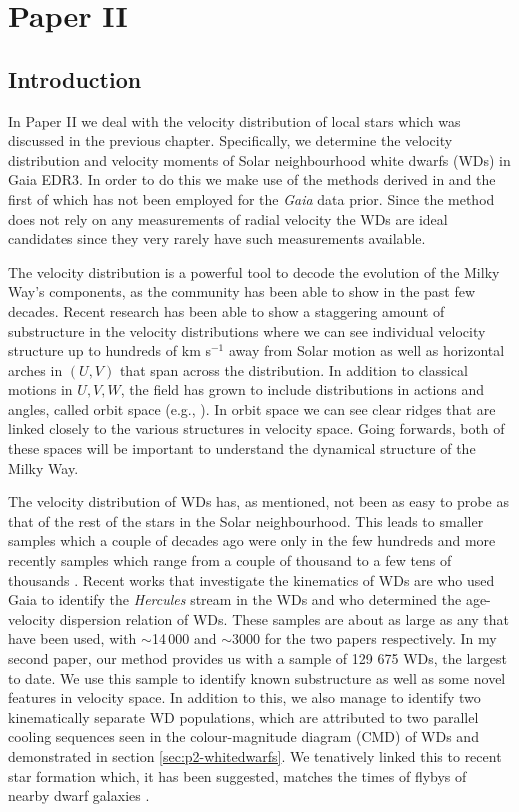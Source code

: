 \chapter{Paper II}\label{chap:paper2}
\section{Introduction}\label{sec:p2-intro}
In Paper II we deal with the velocity distribution of local stars which was discussed in the previous chapter. Specifically, we determine the velocity distribution and velocity moments of Solar neighbourhood white dwarfs (WDs) in Gaia EDR3. In order to do this we make use of the methods derived in \cite{dehnen:98a} and \cite{dehnen:98b} the first of which has not been employed for the \textit{Gaia} data prior. Since the method does not rely on any measurements of radial velocity the WDs are ideal candidates since they very rarely have such measurements available. 

The velocity distribution is a powerful tool to decode the evolution of the Milky Way's components, as the community has been able to show in the past few decades. Recent research has been able to show a staggering amount of substructure in the velocity distributions \citep{antoja:12, kushniruk:17, dr2:kinematics} where we can see individual velocity structure up to hundreds of km s$^{-1}$ away from Solar motion as well as horizontal arches in $(U, V)$ that span across the distribution. In addition to classical motions in $U, V, W$, the field has grown to include distributions in actions and angles, called orbit space (e.g., \citealt{trick:19, trick:21, trick:22}). In orbit space we can see clear ridges that are linked closely to the various structures in velocity space. Going forwards, both of these spaces will be important to understand the dynamical structure of the Milky Way.

The velocity distribution of WDs has, as mentioned, not been as easy to probe as that of the rest of the stars in the Solar neighbourhood. This leads to smaller samples which a couple of decades ago were only in the few hundreds \citep{sion:77, sion:88} and more recently samples which range from a couple of thousand to a few tens of thousands \citep{rowell:11, anguiano:17}. Recent works that investigate the kinematics of WDs are \cite{torres:19} who used Gaia to identify the \textit{Hercules} stream in the WDs and \cite{raddi:22} who determined the age-velocity dispersion relation of WDs. These samples are about as large as any that have been used, with {$\sim$}14\,000 and {$\sim$}3000 for the two papers respectively. In my second paper, our method provides us with a sample of 129 675 WDs, the largest to date. We use this sample to identify known substructure as well as some novel features in velocity space. In addition to this, we also manage to identify two kinematically separate WD populations, which are attributed to two parallel cooling sequences seen in the colour-magnitude diagram (CMD) of WDs and demonstrated in section \ref{sec:p2-whitedwarfs}. We tenatively linked this to recent star formation which, it has been suggested, matches the times of flybys of nearby dwarf galaxies \citep{ruiz-lara:20}. 

